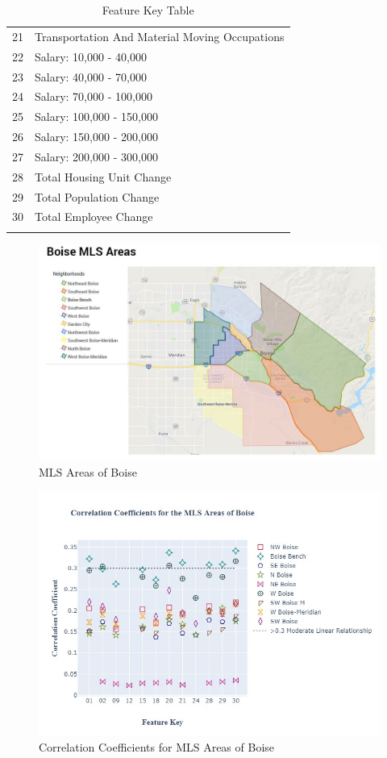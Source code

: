 \documentclass{article}
\begin{document}
\begin{table}[H]
{\begin{tabular}{|c|l|}
    \Xhline{1 pt} 
    21     &  Transportation And Material Moving Occupations\\
    \Xhline{1 pt} 
    22  & Salary: 10,000 - 40,000\\
    \Xhline{1 pt} 
    23  & Salary: 40,000 - 70,000\\
    \Xhline{1 pt} 
    24  & Salary: 70,000 - 100,000\\
    \Xhline{1 pt} 
    25  & Salary: 100,000 - 150,000\\
    \Xhline{1 pt} 
    26  & Salary: 150,000 - 200,000\\
    \Xhline{1 pt} 
    27  & Salary: 200,000 - 300,000\\
    \Xhline{1 pt} 
    28  & Total Housing Unit Change\\
    \Xhline{1 pt} 
    29  & Total Population Change\\
    \Xhline{1 pt} 
    30  & Total Employee Change \\
    \Xhline{1 pt} 
    \end{tabular}}
    \caption{Feature Key Table}
    \label{tab: feature_key}
\end{table}





\begin{figure}[H]
    \centering
    \includegraphics[width= .7\linewidth]{MLS_Areas.JPG}
    \caption{MLS Areas of Boise}
    \label{fig: mls_map}
\end{figure}

\begin{figure}[H]
    \centering
    \includegraphics[width= .7\linewidth]{Area_fig.jpg}
    \caption{Correlation Coefficients for MLS Areas of Boise}
    \label{fig: area_ccl}
\end{figure}
\end{document}
